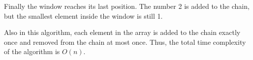 Finally the window reaches its last position.
The number 2 is added to the chain,
but the smallest element inside the window
is still 1.
\begin{center}
\end{center}

Also in this algorithm, each element in the array
is added to the chain exactly once and
removed from the chain at most once.
Thus, the total time complexity of the algorithm is $O(n)$.



